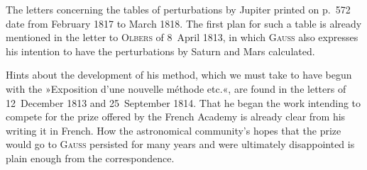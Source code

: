 \par\noindent\hspace*{\parindent}The letters concerning the tables of perturbations by Jupiter printed on p.~572 date from
February 1817 to March 1818. The first plan for such a table is already mentioned in the letter to \textsc{Olbers} of
8~April 1813, in which \textsc{Gauss} also expresses his intention to have the perturbations by Saturn and
Mars calculated.

\par\noindent\hspace*{\parindent}Hints about the development of his method, which we must take to have begun with the »Exposition d’une nouvelle méthode
etc.«, are found in the letters of 12~December 1813 and 25~September
1814. That he began the work intending to compete for the prize offered by the French Academy
is already clear from his writing it in French. How the
astronomical community's hopes that the prize would go to \textsc{Gauss} persisted for many years
and were ultimately disappointed is plain enough from the correspondence.
\endgroup
\endgroup
